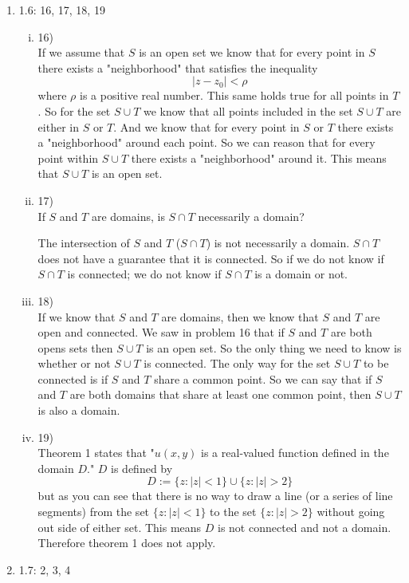 \documentclass[11pt]{article}
\begin{document}
\begin{enumerate}
\item 1.6: 16, 17, 18, 19
\begin{enumerate}[(i)]
\item 16)\\
If we assume that $S$ is an open set we know that for every point in $S$ there exists a "neighborhood" that satisfies the inequality
$$|z - z_0| < \rho$$ where $\rho$ is a positive real number.
This same holds true for all points in $T$. So for the set $S\cup T$ we know that all points included in the set $S\cup T$ are either in $S$ or $T$. And we know that for every point in $S$ or $T$ there exists a "neighborhood" around each point. So we can reason that for every point within $S\cup T$ there exists a "neighborhood" around it. This means that $S\cup T$ is an open set.

\item 17)\\
If $S$ and $T$ are domains, is $S\cap T$ necessarily a domain?

The intersection of $S$ and $T$ ($S\cap T$) is not necessarily a domain. $S\cap T$ does not have a guarantee that it is connected. So if we do not know if $S\cap T$ is connected; we do not know if $S \cap T$ is a domain or not.

\item 18)\\
If we know that $S$ and $T$ are domains, then we know that $S$ and $T$ are open and connected. We saw in problem 16 that if $S$ and $T$ are both opens sets then $S\cup T$ is an open set. So the only thing we need to know is whether or not $S\cup T$ is connected. The only way for the set $S \cup T$ to be connected is if $S$ and $T$ share a common point. So we can say that if $S$ and $T$ are both domains that share at least one common point, then $S\cup T$ is also a domain.
\item 19)\\
Theorem 1 states that "$u(x,y)$ is a real-valued function defined in the domain $D$." $D$ is defined by
$$D := \{z : |z| < 1\}\cup\{z:|z| > 2\}$$
but as you can see that there is no way to draw a line (or a series of line segments) from the set $\{z: |z| < 1\}$ to the set $\{z: |z| > 2\}$ without going out side of either set. This means $D$ is not connected and not a domain. Therefore theorem 1 does not apply.
\end{enumerate}

\item 1.7:  2, 3, 4
\begin{enumerate}[(i)]


\end{enumerate}
\end{enumerate}
\end{document}
